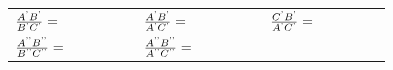 {\begin{center}
\begin{xtabular*}{\mytablewidth}[t]{|p{10\mystarwidth}|p{10\mystarwidth}|p{10\mystarwidth}|}
    
        
                \begin{math}\frac{{A}^{\text{'}}{B}^{\text{'}}}{{B}^{\text{'}}{C}^{\text{'}}}=\phantom{\rule{42.67912pt}{0ex}}\end{math}
               &
    
    
        
                \begin{math}\frac{{A}^{\text{'}}{B}^{\text{'}}}{{A}^{\text{'}}{C}^{\text{'}}}=\phantom{\rule{42.67912pt}{0ex}}\end{math}
               &
    
    
        
                \begin{math}\frac{{C}^{\text{'}}{B}^{\text{'}}}{{A}^{\text{'}}{C}^{\text{'}}}=\phantom{\rule{42.67912pt}{0ex}}\end{math}
     \tabularnewline{}
    
    
        
                \begin{math}\frac{{A}^{\text{'}\text{'}}{B}^{\text{'}\text{'}}}{{B}^{\text{'}\text{'}}{C}^{\text{'}\text{'}}}=\phantom{\rule{42.67912pt}{0ex}}\end{math}
               &
    
    
        
                \begin{math}\frac{{A}^{\text{'}\text{'}}{B}^{\text{'}\text{'}}}{{A}^{\text{'}\text{'}}{C}^{\text{'}\text{'}}}=\phantom{\rule{42.67912pt}{0ex}}\end{math}
               &
    

\end{xtabular*}
\end{center}}
